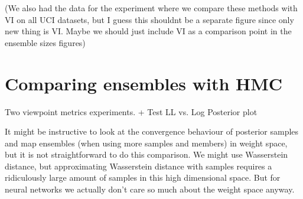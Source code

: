 \documentclass[12pt, A4, twoside]{report}
\begin{document}
(We also had the data for the experiment where we compare these methods with VI on all UCI datasets, but I guess this shouldnt be a separate figure since only new thing is VI. Maybe we should just include VI as a comparison point in the ensemble sizes figures)








\chapter{Comparing ensembles with HMC}

Two viewpoint metrics experiments.
+ Test LL vs. Log Posterior plot

It might be instructive to look at the convergence behaviour of posterior samples and map ensembles (when using more samples and members) in weight space, but it is not straightforward to do this comparison. We might use Wasserstein distance, but approximating Wasserstein distance with samples requires a ridiculously large amount of samples in this high dimensional space. But for neural networks we actually don't care so much about the weight space anyway.
\end{document}

